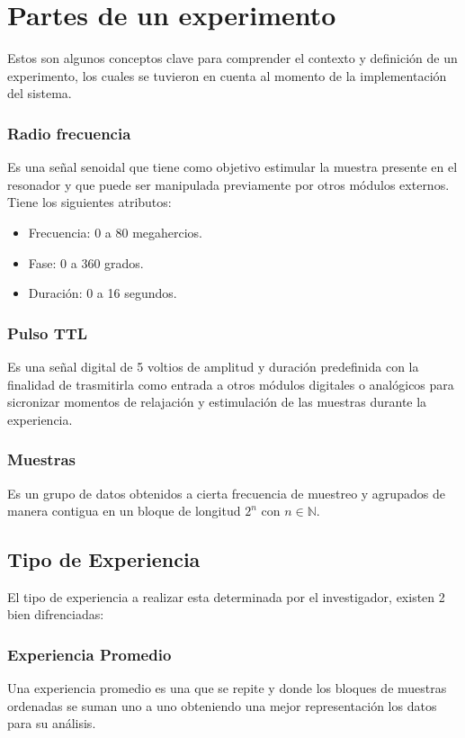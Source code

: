 \section{Partes de un experimento}

Estos son algunos conceptos clave para comprender el contexto y definici\'on de un
experimento, los cuales se tuvieron en cuenta al momento de la implementaci\'on 
del sistema.

\subsubsection{Radio frecuencia}
Es una se\~nal senoidal que tiene como objetivo
estimular la muestra presente en el resonador
y que puede ser manipulada previamente
por otros m\'odulos externos. Tiene los siguientes atributos:
    \begin{itemize}
        \item Frecuencia: 0 a 80 megahercios.
        \item Fase: 0 a 360 grados.
        \item Duraci\'on: 0 a 16 segundos.
    \end{itemize}

\subsubsection{Pulso TTL}
Es una se\~nal digital de 5 voltios de amplitud y duraci\'on predefinida con la finalidad de trasmitirla como entrada a otros m\'odulos digitales o anal\'ogicos para sicronizar momentos de relajaci\'on y estimulaci\'on de las muestras durante la experiencia.

\subsubsection{Muestras}
Es un grupo de datos obtenidos a cierta frecuencia de muestreo y agrupados de manera contigua 
en un bloque de longitud $2^{n}$ con $n \in \mathbb{N}$. 

\subsection{Tipo de Experiencia}
El tipo de experiencia a realizar esta determinada por el investigador, existen 2 bien difrenciadas:

\subsubsection{Experiencia Promedio}
Una experiencia promedio es una que se repite y donde los bloques de muestras ordenadas se suman uno a uno obteniendo
una mejor representaci\'on los datos para su an\'alisis.

